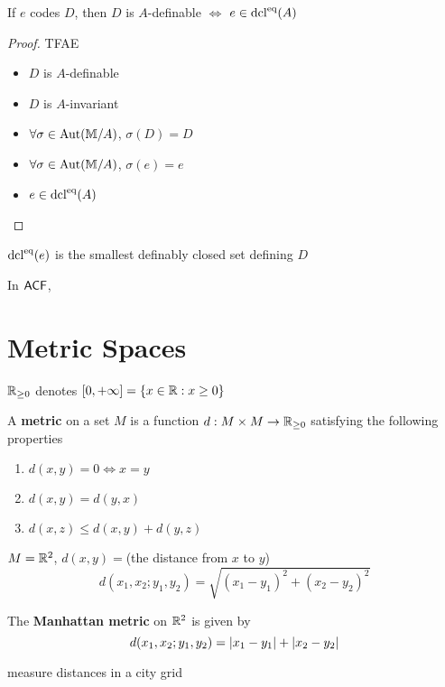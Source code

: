 \documentclass[11pt]{article}
\begin{document}
\begin{remark}
If \(e\) codes \(D\), then \(D\) is \(A\)-definable  \(\Leftrightarrow\) \(e\in\operatorname{dcl}^{\operatorname{eq}}(A)\)
\end{remark}

\begin{proof}
TFAE
\begin{itemize}
\item \(D\) is \(A\)-definable
\item \(D\) is \(A\)-invariant
\item \(\forall\sigma\in\operatorname{\text{Aut}}(\mathbb{M}/A)\), \(\sigma(D)=D\)
\item \(\forall\sigma\in\operatorname{\text{Aut}}(\mathbb{M}/A)\), \(\sigma(e)=e\)
\item \(e\in\operatorname{dcl}^{\operatorname{eq}}(A)\)
\end{itemize}
\end{proof}

\begin{corollary}[]
\(\operatorname{dcl}^{\operatorname{eq}}(e)\) is the smallest definably closed set defining \(D\)
\end{corollary}

\begin{examplle}[]
In \(\textsf{ACF}\),
\end{examplle}


\appendix
\section{Metric Spaces}
\label{sec:orgffe0f21}
\(\mathbb{R}_{\ge 0}\) denotes \([0,+\infty]=\{x\in\mathbb{R}:x\ge 0\}\)
\begin{definition}[]
A \textbf{metric} on a set \(M\) is a function \(d:M\times M\to\mathbb{R}_{\ge 0}\) satisfying the following properties
\begin{enumerate}
\item \(d(x,y)=0\Leftrightarrow x=y\)
\item \(d(x,y)=d(y,x)\)
\item \(d(x,z)\le d(x,y)+d(y,z)\)
\end{enumerate}
\end{definition}

\begin{examplle}[]
\(M=\mathbb{R}^2\), \(d(x,y)=\)(the distance from \(x\) to \(y\))
\begin{equation*}
  d(x_1,x_2;y_1,y_2)=\sqrt{(x_1-y_1)^2+(x_2-y_2)^2}
\end{equation*}
\end{examplle}

\begin{examplle}[]
The \textbf{Manhattan metric} on \(\mathbb{R}^2\) is given by
\begin{equation*}
  d(x_1,x_2;y_1,y_2)=\abs{x_1-y_1}+\abs{x_2-y_2}
\end{equation*}

measure distances in a city grid
\end{examplle}
\end{document}
